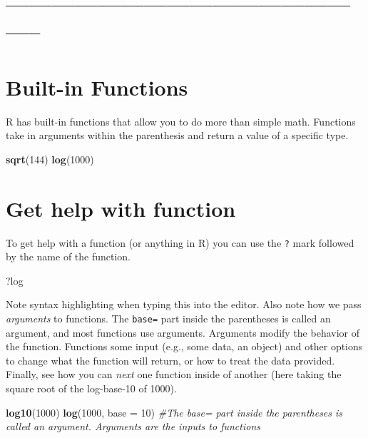 \documentclass[]{article}
\newenvironment{Shaded}{\begin{snugshade}}{\end{snugshade}}
\newcommand{\KeywordTok}[1]{\textcolor[rgb]{0.13,0.29,0.53}{\textbf{{#1}}}}
\newcommand{\DataTypeTok}[1]{\textcolor[rgb]{0.13,0.29,0.53}{{#1}}}
\newcommand{\DecValTok}[1]{\textcolor[rgb]{0.00,0.00,0.81}{{#1}}}
\newcommand{\CommentTok}[1]{\textcolor[rgb]{0.56,0.35,0.01}{\textit{{#1}}}}
\newcommand{\NormalTok}[1]{{#1}}
\begin{document}
\section{--------------------------------------------------}\label{section}

\section{Built-in Functions}\label{built-in-functions}

R has built-in functions that allow you to do more than simple math.
Functions take in arguments within the parenthesis and return a value of
a specific type.

\begin{Shaded}
\begin{Highlighting}[]
\KeywordTok{sqrt}\NormalTok{(}\DecValTok{144}\NormalTok{)}
\KeywordTok{log}\NormalTok{(}\DecValTok{1000}\NormalTok{)}
\end{Highlighting}
\end{Shaded}

\section{Get help with function}\label{get-help-with-function}

To get help with a function (or anything in R) you can use the
\texttt{?} mark followed by the name of the function.

\begin{Shaded}
\begin{Highlighting}[]
\NormalTok{?log}
\end{Highlighting}
\end{Shaded}

Note syntax highlighting when typing this into the editor. Also note how
we pass \emph{arguments} to functions. The \texttt{base=} part inside
the parentheses is called an argument, and most functions use arguments.
Arguments modify the behavior of the function. Functions some input
(e.g., some data, an object) and other options to change what the
function will return, or how to treat the data provided. Finally, see
how you can \emph{next} one function inside of another (here taking the
square root of the log-base-10 of 1000).

\begin{Shaded}
\begin{Highlighting}[]
\KeywordTok{log10}\NormalTok{(}\DecValTok{1000}\NormalTok{)}
\KeywordTok{log}\NormalTok{(}\DecValTok{1000}\NormalTok{, }\DataTypeTok{base =} \DecValTok{10}\NormalTok{)}
\CommentTok{#The base= part inside the parentheses is called an argument. Arguments are the inputs to functions}
\end{Highlighting}
\end{Shaded}
\end{document}
